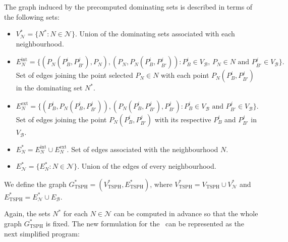 \documentclass[a4paper,  review, authoryear, 1p.]{elsarticle}
\newcommand{\TSPHN}{{\sf{H-TSPHN}\xspace }}
\newcommand{\VB}{{V^{}_{\mathcal B}}}
\newcommand{\EB}{{E^{}_{\mathcal B}}}
\newcommand{\VTSPH}{{V_{\text{TSPH}}}}
\newcommand{\GTSPHS}{{G^{*}_{\text{TSPH}}}}
\newcommand{\VTSPHS}{{V^{*}_{\text{TSPH}}}}
\newcommand{\ETSPHS}{{E^{*}_{\text{TSPH}}}}
\begin{document}
	
	The graph induced by the precomputed dominating sets is described in terms of the following sets:
	\begin{itemize}
		\item $V_\mathcal N^*=\{N^*:N\in\mathcal N\}$. Union of the dominating sets associated with each neighbourhood.
		\item $E_N^{\text{int}}=\{(P_N(P_B^i, P_{B'}^j), P_N), (P_N, P_N(P_B^i, P_{B'}^j)) :P_B^i\in\VB,\,P_N\in N\text{ and }P_{B'}^j\in\VB\}.$ Set of edges joining the point selected $P_N\in N$ with each point $P_N(P_B^i, P_{B'}^j)$ in the dominating set $N^*$.
		\item $E_N^{\text{ext}}=\{(P_B^i, P_N(P_B^i, P_{B'}^j)), (P_N(P_B^i, P_{B'}^j), P_{B'}^j):P_B^i\in\VB\text{ and }P_{B'}^j\in\VB\}.$ Set of edges joining the point $P_N(P_B^i, P_{B'}^j)$ with its respective $P_B^i$ and $P_{B'}^j$ in $\VB$.
		\item $E_N^*=E_N^{\text{int}}\cup E_N^{\text{ext}}$. Set of edges associated with the neighbourhood $N$.
		\item $E_\mathcal N^*= \{E_N^*:N\in\mathcal N\}.$ Union of the edges of every neighbourhood.
	\end{itemize}
	We define the graph $\GTSPHS=(\VTSPHS, \ETSPHS)$, where $\VTSPHS=\VTSPH\cup V^*_\mathcal N$ and $\ETSPHS=E^*_\mathcal N\cup\EB$.
	
	
	Again, the sets $N^*$ for each $N \in \mathcal N$  can be computed in advance so that the whole graph $\GTSPHS$ is fixed. The new formulation for the \TSPHN \ can be represented as the next simplified program:
	
\end{document}
